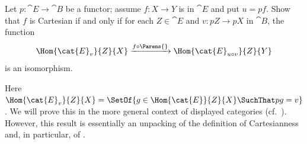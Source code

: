 \begin{exercise}
Let \(p : \cat{E} \to \cat{B}\) be a functor; assume \(f : X \to Y\) is in \(\cat{E}\) and put \(u = p f\).
Show that \(f\) is Cartesian if and only if for each \(Z \in \cat{E}\) and \(v : p Z \to pX\) in \(\cat{B}\), the function
\begin{equation*}
\Hom{\cat{E}_v}{Z}{X} \xrightarrow{f \circ \Parens{}} \Hom{\cat{E}_{u \circ v}}{Z}{Y}
\end{equation*}
is an isomorphism.
\end{exercise}

\begin{remark}
Here \(\Hom{\cat{E}_v}{Z}{X} = \SetOf{g \in \Hom{\cat{E}}{Z}{X} \SuchThat p g = v}\).
We will prove this in the more general context of displayed categories (cf.~\cite{lmcs:5252}).
However, this result is essentially an unpacking of the definition of Cartesianness and, in particular, of \cite[Definition~5.1]{lmcs:5252}.
\end{remark}

